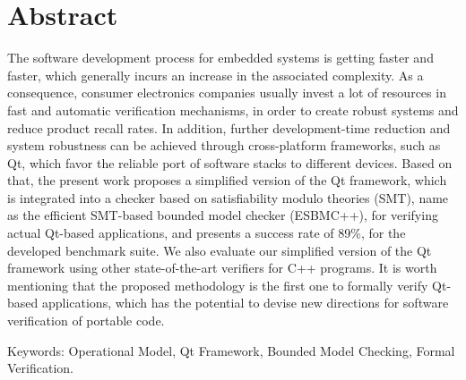 \chapter*{Abstract}
\thispagestyle{empty}


The software development process for embedded systems is getting faster and faster, which generally incurs an increase in the associated complexity. As a consequence, consumer electronics companies usually invest a lot of resources in fast and automatic verification mechanisms, in order to create robust systems and reduce product recall rates. In addition, further development-time reduction and system robustness can be achieved through cross-platform frameworks, such as Qt, which favor the reliable port of software stacks to different devices. Based on that, the present work proposes a simplified version of the Qt framework, which is integrated into a checker based on satisfiability modulo theories (SMT), name as the efficient SMT-based bounded model checker (ESBMC++), for verifying actual Qt-based applications, and presents a success rate of 89\%, for the developed benchmark suite. We also evaluate our simplified version of the Qt framework using other state-of-the-art verifiers for C++ programs. It is worth mentioning that the proposed methodology is the first one to formally verify Qt-based applications, which has the potential to devise new directions for software verification of portable code.


\noindent \textsf{Keywords:} Operational Model, Qt Framework, Bounded Model Checking, Formal Verification.


\cleardoublepage

